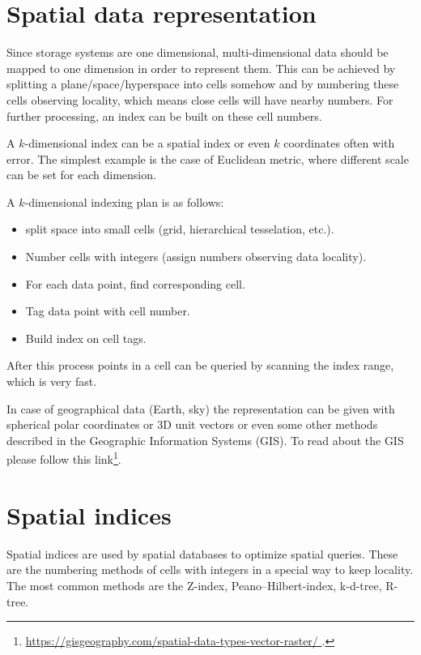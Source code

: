 \documentclass[12pt]{article}
\theoremstyle{plain}
\begin{document}
\section{Spatial data representation}

Since storage systems are one dimensional, multi-dimensional data should be mapped to one dimension in order to represent them. This can be achieved by splitting a plane/space/hyperspace into cells somehow and by numbering these cells observing locality, which means close cells will have nearby numbers. For further processing, an index can be built on these cell numbers. 

A $k$-dimensional index can be a spatial index or even $k$ coordinates often with error. The simplest example is the case of Euclidean metric, where different scale can be set for each dimension.

A $k$-dimensional indexing plan is as follows:

\begin{itemize}
	\item split space into small cells (grid, hierarchical tesselation, etc.).
	\item Number cells with integers (assign numbers observing data locality).
	\item For each data point, find corresponding cell.
	\item Tag data point with cell number.
	\item Build index on cell tags.
\end{itemize}

After this process points in a cell can be queried by scanning the index range, which is very fast.

In case of geographical data (Earth, sky) the representation can be given with spherical polar coordinates or 3D unit vectors or even some other methods described in the Geographic Information Systems (GIS). To read about the GIS please follow this link\footnote{\url{https://gisgeography.com/spatial-data-types-vector-raster/
}.}.

\section{Spatial indices}

Spatial indices are used by spatial databases to optimize spatial queries. These are the numbering methods of cells with integers in a special way to keep locality. The most common methods are the Z-index, Peano–Hilbert-index, k-d-tree, R-tree.
\end{document}
